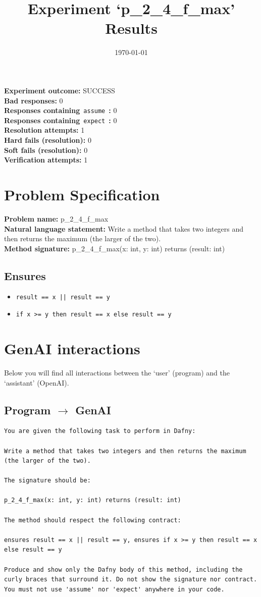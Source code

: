 \documentclass{article}
\begin{document}
\title{Experiment `p\_2\_4\_f\_max' Results}
\author{\today}
\date{}
\maketitle
\textbf{Experiment outcome: }SUCCESS
\\\textbf{Bad responses: }0
\\\textbf{Responses containing}~\texttt{assume}~\textbf{: }0
\\\textbf{Responses containing}~\texttt{expect}~\textbf{: }0
\\\textbf{Resolution attempts: }1
\\\textbf{Hard fails (resolution): }0
\\\textbf{Soft fails (resolution): }0
\\\textbf{Verification attempts: }1
\section*{Problem Specification}
\textbf{Problem name: }p\_2\_4\_f\_max
\\\textbf{Natural language statement: }Write a method that takes two integers and then returns the maximum (the larger of the two).
\\\textbf{Method signature: }p\_2\_4\_f\_max(x: int, y: int) returns (result: int)
\subsection*{Ensures}
\begin{itemize}
\item \texttt{result == x || result == y}
\item \texttt{if x >= y then result == x else result == y}
\end{itemize}
\clearpage
\section*{GenAI interactions}
Below you will find all interactions between the `user' (program) and the `assistant' (OpenAI).
\subsection*{Program $\rightarrow$ GenAI}
\begin{lstlisting}
You are given the following task to perform in Dafny:

Write a method that takes two integers and then returns the maximum (the larger of the two).

The signature should be:

p_2_4_f_max(x: int, y: int) returns (result: int)

The method should respect the following contract:

ensures result == x || result == y, ensures if x >= y then result == x else result == y

Produce and show only the Dafny body of this method, including the curly braces that surround it. Do not show the signature nor contract. You must not use 'assume' nor 'expect' anywhere in your code.
\end{lstlisting}
\end{document}
